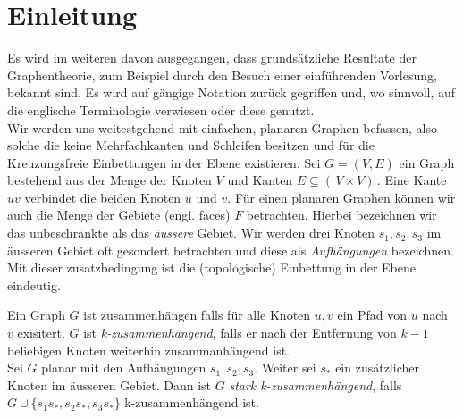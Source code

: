 \chapter{Einleitung}\label{intro}

Es wird im weiteren davon ausgegangen, dass grundsätzliche Resultate der Graphentheorie, zum Beispiel durch den Besuch einer einführenden Vorlesung, bekannt sind. Es wird auf gängige Notation zurück gegriffen und, wo sinnvoll, auf die englische Terminologie verwiesen oder diese genutzt. \\
Wir werden uns weitestgehend mit einfachen, planaren Graphen befassen, also solche die keine Mehrfachkanten und Schleifen besitzen und für die Kreuzungsfreie Einbettungen in der Ebene existieren. Sei $G = (V,E)$ ein Graph bestehend aus der Menge der Knoten $V$ und Kanten $E \subseteq ( \,V \times V ) \,$. Eine Kante $uv$ verbindet die beiden Knoten $u$ und $v$. Für einen planaren Graphen können wir auch die Menge der Gebiete (engl. faces) $F$ betrachten. Hierbei bezeichnen wir das unbeschränkte als das \textit{äussere} Gebiet. Wir werden drei Knoten $s_1,s_2,s_3$ im äusseren Gebiet oft gesondert betrachten und diese als \textit{Aufhängungen} bezeichnen. Mit dieser zusatzbedingung ist die (topologische) Einbettung in der Ebene eindeutig. 

\begin{definition}
Ein Graph $G$ ist zusammenhängen falls für alle Knoten $u,v$ ein Pfad von $u$ nach $v$ exisitert. $G$ ist \textit{k-zusammenhängend}, falls er nach der Entfernung von $k-1$ beliebigen Knoten weiterhin zusammanhängend ist.\\
Sei $G$ planar mit den Aufhängungen $s_1,s_2,s_3$. Weiter sei $s_*$ ein zusätzlicher Knoten im äusseren Gebiet. Dann ist $G$ \textit{stark k-zusammenhängend}, falls $G \cup \{ s_1s_*,s_2s_*,s_3s_* \}$ k-zusammenhängend ist. 
\end{definition}





